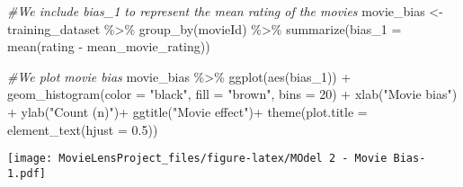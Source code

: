 \documentclass[
]{article}
\newenvironment{Shaded}{\begin{snugshade}}{\end{snugshade}}
\newcommand{\AttributeTok}[1]{\textcolor[rgb]{0.77,0.63,0.00}{#1}}
\newcommand{\CommentTok}[1]{\textcolor[rgb]{0.56,0.35,0.01}{\textit{#1}}}
\newcommand{\DecValTok}[1]{\textcolor[rgb]{0.00,0.00,0.81}{#1}}
\newcommand{\FloatTok}[1]{\textcolor[rgb]{0.00,0.00,0.81}{#1}}
\newcommand{\FunctionTok}[1]{\textcolor[rgb]{0.00,0.00,0.00}{#1}}
\newcommand{\NormalTok}[1]{#1}
\newcommand{\OtherTok}[1]{\textcolor[rgb]{0.56,0.35,0.01}{#1}}
\newcommand{\SpecialCharTok}[1]{\textcolor[rgb]{0.00,0.00,0.00}{#1}}
\newcommand{\StringTok}[1]{\textcolor[rgb]{0.31,0.60,0.02}{#1}}
\begin{document}
\begin{Shaded}
\begin{Highlighting}[]
\CommentTok{\#We include bias\_1 to represent the mean rating of the movies}
\NormalTok{movie\_bias }\OtherTok{\textless{}{-}}\NormalTok{ training\_dataset }\SpecialCharTok{\%\textgreater{}\%}
  \FunctionTok{group\_by}\NormalTok{(movieId) }\SpecialCharTok{\%\textgreater{}\%}
  \FunctionTok{summarize}\NormalTok{(}\AttributeTok{bias\_1 =} \FunctionTok{mean}\NormalTok{(rating }\SpecialCharTok{{-}}\NormalTok{ mean\_movie\_rating))}

\CommentTok{\#We plot movie bias}
\NormalTok{movie\_bias }\SpecialCharTok{\%\textgreater{}\%} \FunctionTok{ggplot}\NormalTok{(}\FunctionTok{aes}\NormalTok{(bias\_1)) }\SpecialCharTok{+}
  \FunctionTok{geom\_histogram}\NormalTok{(}\AttributeTok{color =} \StringTok{"black"}\NormalTok{, }\AttributeTok{fill =} \StringTok{"brown"}\NormalTok{, }\AttributeTok{bins =} \DecValTok{20}\NormalTok{) }\SpecialCharTok{+}
  \FunctionTok{xlab}\NormalTok{(}\StringTok{"Movie bias"}\NormalTok{) }\SpecialCharTok{+}
  \FunctionTok{ylab}\NormalTok{(}\StringTok{"Count (n)"}\NormalTok{)}\SpecialCharTok{+}
  \FunctionTok{ggtitle}\NormalTok{(}\StringTok{"Movie effect"}\NormalTok{)}\SpecialCharTok{+}
  \FunctionTok{theme}\NormalTok{(}\AttributeTok{plot.title =} \FunctionTok{element\_text}\NormalTok{(}\AttributeTok{hjust =} \FloatTok{0.5}\NormalTok{))}
\end{Highlighting}
\end{Shaded}

\texttt{[image: MovieLensProject\_files/figure-latex/MOdel 2 - Movie Bias-1.pdf]}

\begin{Shaded}
\end{Shaded}
\end{document}
